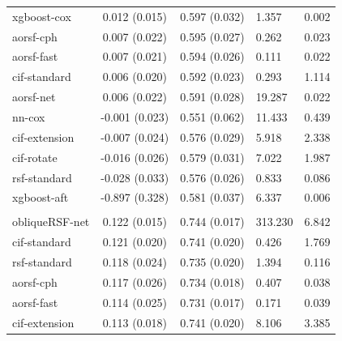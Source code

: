 \documentclass[twoside,11pt]{article}\usepackage[]{graphicx}\usepackage[]{xcolor}
\newenvironment{knitrout}{}{} %
\begin{document}
\begin{knitrout}
\begin{longtable}[t]{lcclc}
\hspace{1em}xgboost-cox & 0.012 (0.015) & 0.597 (0.032) & 1.357 & 0.002\\
\hspace{1em}aorsf-cph & 0.007 (0.022) & 0.595 (0.027) & 0.262 & 0.023\\
\hspace{1em}aorsf-fast & 0.007 (0.021) & 0.594 (0.026) & 0.111 & 0.022\\
\hspace{1em}cif-standard & 0.006 (0.020) & 0.592 (0.023) & 0.293 & 1.114\\
\hspace{1em}aorsf-net & 0.006 (0.022) & 0.591 (0.028) & 19.287 & 0.022\\
\hspace{1em}nn-cox & -0.001 (0.023) & 0.551 (0.062) & 11.433 & 0.439\\
\hspace{1em}cif-extension & -0.007 (0.024) & 0.576 (0.029) & 5.918 & 2.338\\
\hspace{1em}cif-rotate & -0.016 (0.026) & 0.579 (0.031) & 7.022 & 1.987\\
\hspace{1em}rsf-standard & -0.028 (0.033) & 0.576 (0.026) & 0.833 & 0.086\\
\hspace{1em}xgboost-aft & -0.897 (0.328) & 0.581 (0.037) & 6.337 & 0.006\\
\addlinespace[0.3em]
\hline
\multicolumn{5}{l}{\textit{\textbf{GBSG II; recurrence or death, n = 686, p = 10}}}\\
\hline
\hspace{1em}obliqueRSF-net & 0.122 (0.015) & 0.744 (0.017) & 313.230 & 6.842\\
\hspace{1em}cif-standard & 0.121 (0.020) & 0.741 (0.020) & 0.426 & 1.769\\
\hspace{1em}rsf-standard & 0.118 (0.024) & 0.735 (0.020) & 1.394 & 0.116\\
\hspace{1em}aorsf-cph & 0.117 (0.026) & 0.734 (0.018) & 0.407 & 0.038\\
\hspace{1em}aorsf-fast & 0.114 (0.025) & 0.731 (0.017) & 0.171 & 0.039\\
\hspace{1em}cif-extension & 0.113 (0.018) & 0.741 (0.020) & 8.106 & 3.385\\

\end{longtable}
\end{knitrout}
\end{document}
